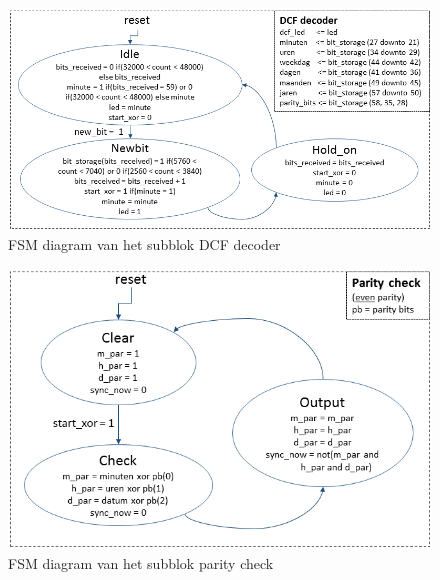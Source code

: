 \begin{figure}[h!]
\begin{center}
\includegraphics[keepaspectratio=true,scale=0.6]{Figuren/DCF77/FSM_decoder}
\captionsetup{justification=centering}\caption{FSM diagram van het subblok DCF decoder}
\label{fig: dcf_decoder}
\end{center}
\end{figure}

\begin{figure}[h!]
\begin{center}
\includegraphics[keepaspectratio=true,scale=0.7]{Figuren/DCF77/FSM_parity_check}
\captionsetup{justification=centering}\caption{FSM diagram van het subblok parity check}
\label{fig: parity_check}
\end{center}
\end{figure}

